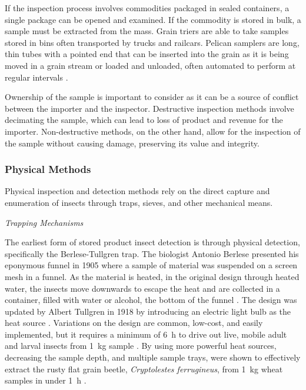 \documentclass[../Vibro-Acoustic Signatures and Detection Algorithms for Stored Product Insects.tex]{subfiles}
\begin{document}
If the inspection process involves commodities packaged in sealed containers, a single package can be opened and examined. If the commodity is stored in bulk, a sample must be extracted from the mass. Grain triers are able to take samples stored in bins often transported by trucks and railcars. Pelican samplers are long, thin tubes with a pointed end that can be inserted into the grain as it is being moved in a grain stream or loaded and unloaded, often automated to perform at regular intervals \cite{serviceStoredProductManagement1995}.

Ownership of the sample is important to consider as it can be a source of conflict between the importer and the inspector. Destructive inspection methods involve decimating the sample, which can lead to loss of product and revenue for the importer. Non-destructive methods, on the other hand, allow for the inspection of the sample without causing damage, preserving its value and integrity.

\newpage
\subsubsection{Physical Methods}

Physical inspection and detection methods rely on the direct capture and enumeration of insects through traps, sieves, and other mechanical means.

\textit{Trapping Mechanisms}

The earliest form of stored product insect detection is through physical detection, specifically the Berlese-Tullgren trap. The biologist Antonio Berlese presented his eponymous funnel in 1905 where a sample of material was suspended on a screen mesh in a funnel. As the material is heated, in the original design through heated water, the insects move downwards to escape the heat and are collected in a container, filled with water or alcohol, the bottom of the funnel \cite{berleseApparecchioRaccoglierePresto1905}. The design was updated by Albert Tullgren in 1918 by introducing an electric light bulb as the heat source \cite{prof.alb.tullgrenSehrEinfacherAusleseapparat1918}. Variations on the design are common, low-cost, and easily implemented, but it requires a minimum of \SI{6}{\hour} to drive out live, mobile adult and larval insects from \SI{1}{\kilo\gram} sample \cite{robinwilkinComparisonTwoApproaches1996}. By using more powerful heat sources, decreasing the sample depth, and multiple sample trays, were shown to effectively extract the rusty flat grain beetle, \textit{Cryptolestes ferrugineus}, from \SI{1}{\kilo\gram} wheat samples in under \SI{1}{\hour} \cite{minkevichRapidMethodDetect2002}.
\end{document}

